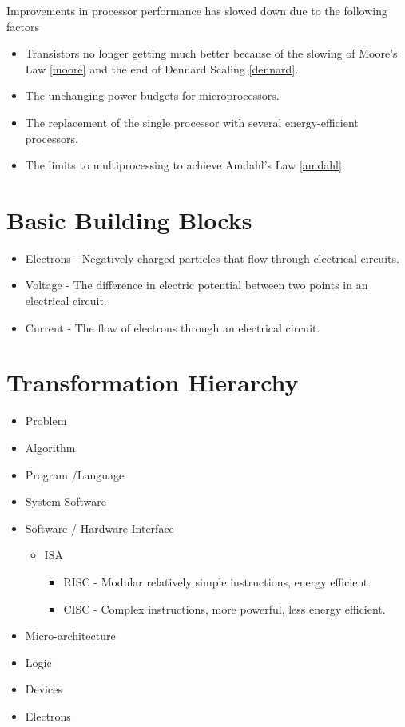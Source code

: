 \documentclass[12pt letter]{report}
\begin{document}

Improvements in processor performance has slowed down due to the following factors
\begin{itemize}
  \item Transistors no longer getting much better because of the slowing of Moore's Law \ref{moore} and the end of Dennard
        Scaling \ref{dennard}.
  \item The unchanging power budgets for microprocessors.
  \item  The replacement of the single processor with several energy-efficient processors.
  \item The limits to multiprocessing to achieve Amdahl's Law \ref{amdahl}.
\end{itemize}

\chapter{Basic Building Blocks}

\begin{itemize}
  \item Electrons - Negatively charged particles that flow through electrical circuits.
  \item Voltage - The difference in electric potential between two points in an electrical circuit.
  \item Current - The flow of electrons through an electrical circuit.
\end{itemize}

\chapter{Transformation Hierarchy}

\begin{itemize}
  \item Problem
  \item Algorithm
  \item Program /Language
  \item System Software
  \item Software / Hardware Interface
        \begin{itemize}
          \item ISA
                \begin{itemize}
                  \item RISC - Modular relatively simple instructions, energy efficient.
                  \item CISC - Complex instructions, more powerful, less energy efficient.
                \end{itemize}
        \end{itemize}
  \item Micro-architecture
  \item Logic
  \item Devices
  \item Electrons
\end{itemize}
\end{document}
